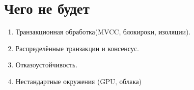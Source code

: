 \documentclass{article}
\begin{document}
\newpage

\section*{Чего не будет}

\begin{enumerate}
    \item Транзакционная обработка(MVCC, блокироки, изоляции).
    \item Распределённые транзакции и консенсус.
    \item Отказоустойчивость.
    \item Нестандартные окружения (GPU, облака)
\end{enumerate}
\end{document}
